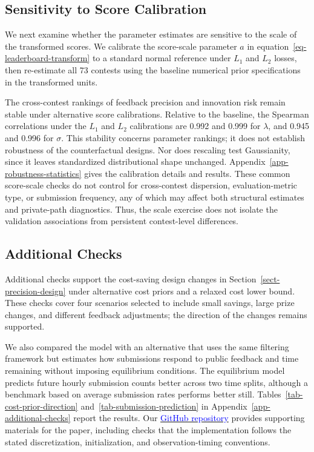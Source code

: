 \documentclass[mnsc]{informs3}
\begin{document}
\subsection{Sensitivity to Score Calibration}\label{sect-robust-normality}

{We next examine whether the parameter estimates are sensitive to the scale of the transformed scores. We calibrate the score-scale parameter $a$ in equation~\eqref{eq-leaderboard-transform} to a standard normal reference under $L_1$ and $L_2$ losses, then re-estimate all 73 contests using the baseline numerical prior specifications in the transformed units.}

The cross-contest rankings of feedback precision and innovation risk remain stable under alternative score calibrations. Relative to the baseline, the Spearman correlations under the $L_1$ and $L_2$ calibrations are 0.992 and 0.999 for $\lambda$, and 0.945 and 0.996 for $\sigma$. This stability concerns parameter rankings; it does not establish robustness of the counterfactual designs. Nor does rescaling test Gaussianity, since it leaves standardized distributional shape unchanged. Appendix~\ref{app-robustness-statistics} gives the calibration details and results.
{These common score-scale checks do not control for cross-contest dispersion, evaluation-metric type, or submission frequency, any of which may affect both structural estimates and private-path diagnostics. Thus, the scale exercise does not isolate the validation associations from persistent contest-level differences.}



\subsection{Additional Checks}\label{sect-additional-checks}

Additional checks support the cost-saving design changes in Section~\ref{sect-precision-design} under alternative cost priors and a relaxed cost lower bound. These checks cover four scenarios selected to include small savings, large prize changes, and different feedback adjustments; the direction of the changes remains supported.

We also compared the model with an alternative that uses the same filtering framework but estimates how submissions respond to public feedback and time remaining without imposing equilibrium conditions. The equilibrium model predicts future hourly submission counts better across two time splits, although a benchmark based on average submission rates performs better still. Tables~\ref{tab-cost-prior-direction} and~\ref{tab-submission-prediction} in Appendix~\ref{app-additional-checks} report the results. Our \href{https://github.com/zhuanglinsheng/kaggle-contest-design}{\textcolor{blue}{GitHub repository}} provides supporting materials for the paper, including checks that the implementation follows the stated discretization, initialization, and observation-timing conventions.
\end{document}
